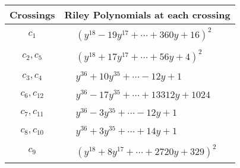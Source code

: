 \documentclass[1p]{elsarticle_modified}
\theoremstyle{definition}
\begin{document}
\begin{tabular}{m{50pt}|m{274pt}}
Crossings & \hspace{64pt}Riley Polynomials at each crossing \\
\hline $$\begin{aligned}c_{1}\end{aligned}$$&$\begin{aligned}
&(y^{18}-19 y^{17}+\cdots+360 y+16)^{2}
\end{aligned}$\\
\hline $$\begin{aligned}c_{2},c_{5}\end{aligned}$$&$\begin{aligned}
&(y^{18}+17 y^{17}+\cdots+56 y+4)^{2}
\end{aligned}$\\
\hline $$\begin{aligned}c_{3},c_{4}\end{aligned}$$&$\begin{aligned}
&y^{36}+10 y^{35}+\cdots-12 y+1
\end{aligned}$\\
\hline $$\begin{aligned}c_{6},c_{12}\end{aligned}$$&$\begin{aligned}
&y^{36}-17 y^{35}+\cdots+13312 y+1024
\end{aligned}$\\
\hline $$\begin{aligned}c_{7},c_{11}\end{aligned}$$&$\begin{aligned}
&y^{36}-3 y^{35}+\cdots-12 y+1
\end{aligned}$\\
\hline $$\begin{aligned}c_{8},c_{10}\end{aligned}$$&$\begin{aligned}
&y^{36}+3 y^{35}+\cdots+14 y+1
\end{aligned}$\\
\hline $$\begin{aligned}c_{9}\end{aligned}$$&$\begin{aligned}
&(y^{18}+8 y^{17}+\cdots+2720 y+329)^{2}
\end{aligned}$\\
\hline
\end{tabular}\\~\\
\end{document}
